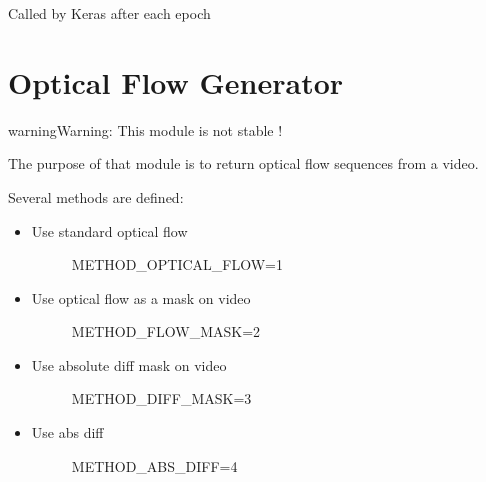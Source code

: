 \documentclass[letterpaper,10pt,english]{sphinxmanual}
\begin{document}
\begin{fulllineitems}
\begin{fulllineitems}
\end{fulllineitems}


\begin{fulllineitems}
\label{\detokenize{index:keras_video.sliding.SlidingFrameGenerator.on_epoch_end}}
Called by Keras after each epoch

\end{fulllineitems}


\end{fulllineitems}

\label{\detokenize{index:module-keras_video.flow}}

\chapter{Optical Flow Generator}
\label{\detokenize{index:optical-flow-generator}}
\begin{sphinxadmonition}{warning}{Warning:}
This module is not stable !
\end{sphinxadmonition}

The purpose of that module is to return optical flow sequences from a video.

Several methods are defined:
\begin{itemize}
\item {} \begin{description}
\item[{Use standard optical flow}] \leavevmode
METHOD\_OPTICAL\_FLOW=1

\end{description}

\item {} \begin{description}
\item[{Use optical flow as a mask on video}] \leavevmode
METHOD\_FLOW\_MASK=2

\end{description}

\item {} \begin{description}
\item[{Use absolute diff mask on video}] \leavevmode
METHOD\_DIFF\_MASK=3

\end{description}

\item {} \begin{description}
\item[{Use abs diff}] \leavevmode
METHOD\_ABS\_DIFF=4

\end{description}

\end{itemize}
\end{document}
